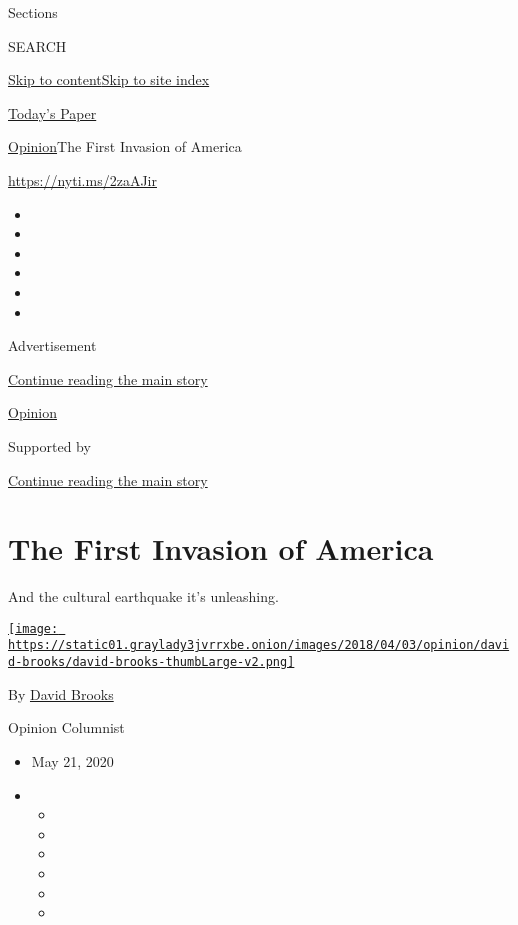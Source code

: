 Sections

SEARCH

\protect\hyperlink{site-content}{Skip to
content}\protect\hyperlink{site-index}{Skip to site index}

\href{https://myaccount.nytimes3xbfgragh.onion/auth/login?response_type=cookie\&client_id=vi}{}

\href{https://www.nytimes3xbfgragh.onion/section/todayspaper}{Today's
Paper}

\href{/section/opinion}{Opinion}\textbar{}The First Invasion of America

\url{https://nyti.ms/2zaAJir}

\begin{itemize}
\item
\item
\item
\item
\item
\item
\end{itemize}

Advertisement

\protect\hyperlink{after-top}{Continue reading the main story}

\href{/section/opinion}{Opinion}

Supported by

\protect\hyperlink{after-sponsor}{Continue reading the main story}

\hypertarget{the-first-invasion-of-america}{%
\section{The First Invasion of
America}\label{the-first-invasion-of-america}}

And the cultural earthquake it's unleashing.

\href{https://www.nytimes3xbfgragh.onion/by/david-brooks}{\texttt{[image: https://static01.graylady3jvrrxbe.onion/images/2018/04/03/opinion/david-brooks/david-brooks-thumbLarge-v2.png]}}

By \href{https://www.nytimes3xbfgragh.onion/by/david-brooks}{David
Brooks}

Opinion Columnist

\begin{itemize}
\item
  May 21, 2020
\item
  \begin{itemize}
  \item
  \item
  \item
  \item
  \item
  \item
  \end{itemize}
\end{itemize}

